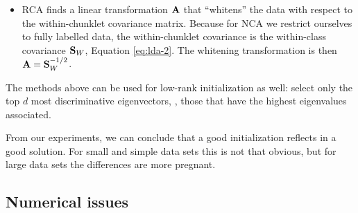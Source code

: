 \begin{itemize}
\begin{itemize}
            \item RCA finds a linear transformation $\mathbf{A}$
                that ``whitens'' the data with respect to
                the within-chunklet covariance matrix.
                Because for NCA we restrict ourselves to
                fully labelled data, the within-chunklet
                covariance is the within-class covariance
                $\mathbf{S}_W$, Equation \ref{eq:lda-2}. The
                whitening transformation is then
                $\mathbf{A}=\mathbf{S}_W^{-1/2}$.
        \end{itemize}

        The methods above can be used for low-rank
        initialization as well: select only the top $d$ most
        discriminative eigenvectors, \ie, those that have the
        highest eigenvalues associated.

        From our experiments, we can conclude that a good
        initialization reflects in a good solution. For small
        and simple data sets this is not that obvious, but for
        large data sets the differences are more pregnant.
\end{itemize}

\subsection{Numerical issues}
\label{subsec:numerical-issues}

